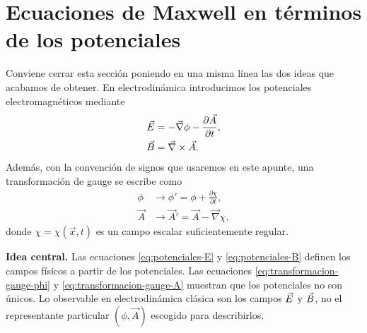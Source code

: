 \documentclass[../main.tex]{subfiles}
\begin{document}
\section{Ecuaciones de Maxwell en términos de los potenciales}

Conviene cerrar esta sección poniendo en una misma línea las dos ideas que acabamos de obtener. En electrodinámica introducimos los potenciales electromagnéticos mediante
\begin{align}
    \vec{E} &= -\vec\nabla \phi - \frac{\partial \vec A}{\partial t},
    \label{eq:potenciales-E}\\
    \vec{B} &= \vec\nabla\times\vec A.
    \label{eq:potenciales-B}
\end{align}
Además, con la convención de signos que usaremos en este apunte, una transformación de gauge se escribe como
\begin{align}
    \phi &\longrightarrow \phi' = \phi + \frac{\partial \chi}{\partial t},
    \label{eq:transformacion-gauge-phi}\\
    \vec A &\longrightarrow \vec A' = \vec A - \vec\nabla\chi,
    \label{eq:transformacion-gauge-A}
\end{align}
donde $\chi=\chi(\vec x,t)$ es un campo escalar suficientemente regular.

\begin{cajaidea}
\textbf{Idea central.} Las ecuaciones \eqref{eq:potenciales-E} y \eqref{eq:potenciales-B} definen los campos físicos a partir de los potenciales. Las ecuaciones \eqref{eq:transformacion-gauge-phi} y \eqref{eq:transformacion-gauge-A} muestran que los potenciales no son únicos. Lo observable en electrodinámica clásica son los campos $\vec{E}$ y $\vec{B}$, no el representante particular $(\phi,\vec A)$ escogido para describirlos.
\end{cajaidea}
\end{document}
